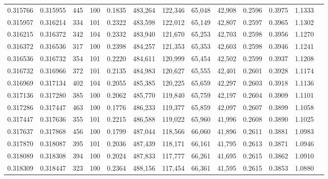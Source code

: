 \begin{tabular}{rrrrrrrrrrrrr}
0.315766 & 0.315955 &   445 & 100 &                                     0.1835 & 483,264 & 122,346 &  65,048 &  42,908 & 0.2596 & 0.3975 & 1.1333 \\
0.315957 & 0.316214 &   334 & 101 &                                     0.2322 & 483,598 & 122,012 &  65,149 &  42,807 & 0.2597 & 0.3965 & 1.1302 \\
0.316215 & 0.316372 &   342 & 104 &                                     0.2332 & 483,940 & 121,670 &  65,253 &  42,703 & 0.2598 & 0.3956 & 1.1270 \\
0.316372 & 0.316536 &   317 & 100 &                                     0.2398 & 484,257 & 121,353 &  65,353 &  42,603 & 0.2598 & 0.3946 & 1.1241 \\
0.316536 & 0.316732 &   354 & 101 &                                     0.2220 & 484,611 & 120,999 &  65,454 &  42,502 & 0.2599 & 0.3937 & 1.1208 \\
0.316732 & 0.316966 &   372 & 101 &                                     0.2135 & 484,983 & 120,627 &  65,555 &  42,401 & 0.2601 & 0.3928 & 1.1174 \\
0.316969 & 0.317134 &   402 & 104 &                                     0.2055 & 485,385 & 120,225 &  65,659 &  42,297 & 0.2603 & 0.3918 & 1.1136 \\
0.317136 & 0.317280 &   385 & 100 &                                     0.2062 & 485,770 & 119,840 &  65,759 &  42,197 & 0.2604 & 0.3909 & 1.1101 \\
0.317286 & 0.317447 &   463 & 100 &                                     0.1776 & 486,233 & 119,377 &  65,859 &  42,097 & 0.2607 & 0.3899 & 1.1058 \\
0.317447 & 0.317636 &   355 & 101 &                                     0.2215 & 486,588 & 119,022 &  65,960 &  41,996 & 0.2608 & 0.3890 & 1.1025 \\
0.317637 & 0.317868 &   456 & 100 &                                     0.1799 & 487,044 & 118,566 &  66,060 &  41,896 & 0.2611 & 0.3881 & 1.0983 \\
0.317870 & 0.318087 &   395 & 101 &                                     0.2036 & 487,439 & 118,171 &  66,161 &  41,795 & 0.2613 & 0.3871 & 1.0946 \\
0.318089 & 0.318308 &   394 & 100 &                                     0.2024 & 487,833 & 117,777 &  66,261 &  41,695 & 0.2615 & 0.3862 & 1.0910 \\
0.318309 & 0.318447 &   323 & 100 &                                     0.2364 & 488,156 & 117,454 &  66,361 &  41,595 & 0.2615 & 0.3853 & 1.0880 \\

\end{tabular}
